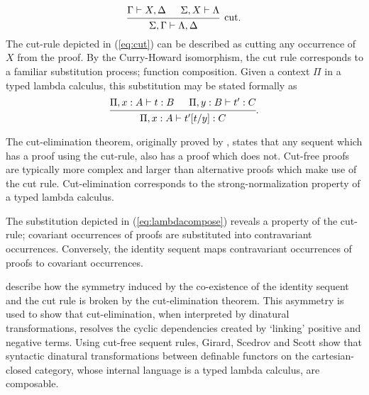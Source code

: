 \documentclass[../../Dissertation.tex]{subfiles}
\begin{document}
\begin{equation}\label{eq:cut}
\begin{prooftree}
  \hypo{\Gamma \vdash X, \Delta}
  \hypo{\Sigma, X \vdash \Lambda}
  \infer2[cut]{\Sigma, \Gamma \vdash \Lambda, \Delta}
\end{prooftree}.
\end{equation}
The cut-rule depicted in (\ref{eq:cut}) can be described as cutting any occurrence of $X$ from the proof. By the Curry-Howard isomorphism, the cut rule corresponds to a familiar substitution process; function composition. Given a context $\Pi$ in a typed lambda calculus, this substitution may be stated formally as
\begin{equation}\label{eq:lambdacompose}
\begin{prooftree}
  \hypo{\Pi, x : A \vdash t : B}
  \hypo{\Pi, y : B \vdash t' : C}
  \infer2[]{\Pi, x : A \vdash t'[t/y] : C}
\end{prooftree}.
\end{equation}
\par
The cut-elimination theorem, originally proved by , states that any sequent which has a proof using the cut-rule, also has a proof which does not. Cut-free proofs are typically more complex and larger than alternative proofs which make use of the cut rule. Cut-elimination corresponds to the strong-normalization property of a typed lambda calculus.
\par
The substitution depicted in (\ref{eq:lambdacompose}) reveals a property of the cut-rule; covariant occurrences of proofs are substituted into contravariant occurrences. Conversely, the identity sequent maps contravariant occurrences of proofs to covariant occurrences. 
\par
{} describe how the symmetry induced by the co-existence of the identity sequent and the cut rule is broken by the cut-elimination theorem. This asymmetry is used to show that cut-elimination, when interpreted by dinatural transformations, resolves the cyclic dependencies created by `linking' positive and negative terms. Using cut-free sequent rules, Girard, Scedrov and Scott show that syntactic dinatural transformations between definable functors on the cartesian-closed category, whose internal language is a typed lambda calculus, are composable.
\end{document}
